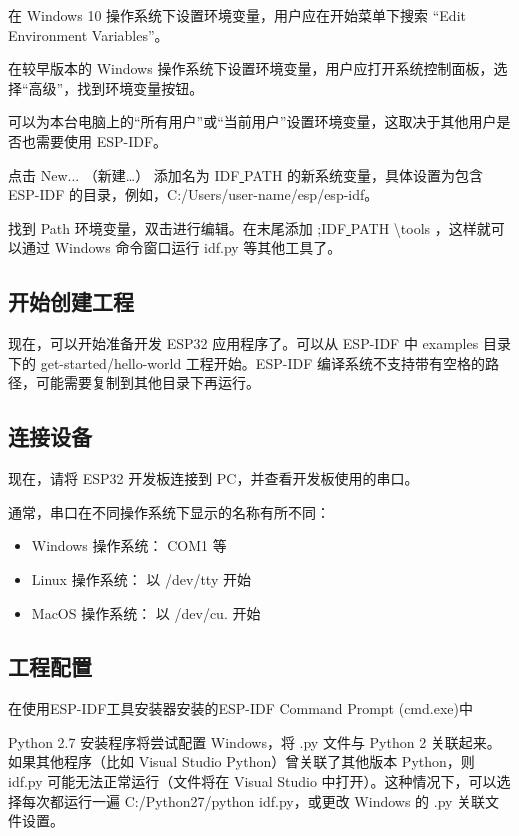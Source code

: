 在 Windows 10 操作系统下设置环境变量，用户应在开始菜单下搜索 “Edit Environment Variables”。

在较早版本的 Windows 操作系统下设置环境变量，用户应打开系统控制面板，选择“高级”，找到环境变量按钮。

可以为本台电脑上的“所有用户”或“当前用户”设置环境变量，这取决于其他用户是否也需要使用 ESP-IDF。

点击 New... （新建…） 添加名为 IDF\underline{ }PATH 的新系统变量，具体设置为包含 ESP-IDF 的目录，例如，C:/Users/user-name/esp/esp-idf。

找到 Path 环境变量，双击进行编辑。在末尾添加 ;IDF\underline{ }PATH \backslash tools ，这样就可以通过 Windows 命令窗口运行 idf.py 等其他工具了。

\subsection{开始创建工程}

现在，可以开始准备开发 ESP32 应用程序了。可以从 ESP-IDF 中 examples 目录下的 get-started/hello-world 工程开始。ESP-IDF 编译系统不支持带有空格的路径，可能需要复制到其他目录下再运行。

\subsection{连接设备}

现在，请将 ESP32 开发板连接到 PC，并查看开发板使用的串口。

通常，串口在不同操作系统下显示的名称有所不同：

\begin{itemize}
    \item Windows 操作系统： COM1 等
    \item Linux 操作系统： 以 /dev/tty 开始
    \item MacOS 操作系统： 以 /dev/cu. 开始
\end{itemize}


\subsection{工程配置}

在使用ESP-IDF工具安装器安装的ESP-IDF Command Prompt (cmd.exe)中

Python 2.7 安装程序将尝试配置 Windows，将 .py 文件与 Python 2 关联起来。如果其他程序（比如 Visual Studio Python）曾关联了其他版本 Python，则 idf.py 可能无法正常运行（文件将在 Visual Studio 中打开）。这种情况下，可以选择每次都运行一遍 C:/Python27/python idf.py，或更改 Windows 的 .py 关联文件设置。

